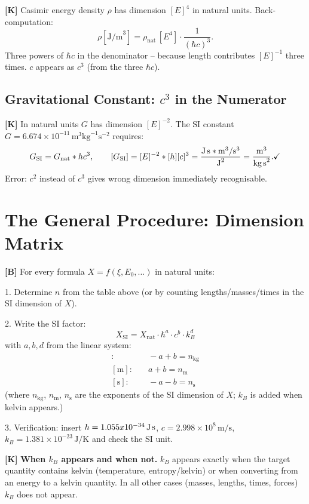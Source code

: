 \textbf{[K]} Casimir energy density $\rho$ has dimension $[E]^4$ in natural
units. Back-computation:
\[
  \rho[\text{J/m}^3]
  = \rho_\text{nat}\,[E^4]\cdot\frac{1}{(\hbar c)^3}.
\]
Three powers of $\hbar c$ in the denominator -- because length contributes
$[E]^{-1}$ three times. $c$ appears as $c^3$ (from the three $\hbar c$).

\subsection{Gravitational Constant: $c^3$ in the Numerator}

\textbf{[K]} In natural units $G$ has dimension $[E]^{-2}$. The SI constant
$G=6{.}674\times10^{-11}\,\text{m}^3\text{kg}^{-1}\text{s}^{-2}$ requires:
\[
  G_\text{SI} = G_\text{nat}\cdot\hbar c^3,
  \qquad
  [G_\text{SI}] = [E]^{-2}\cdot[\hbar][c]^3
  = \frac{\text{J\,s}\cdot\text{m}^3/\text{s}^3}{\text{J}^2}
  = \frac{\text{m}^3}{\text{kg\,s}^2}.\checkmark
\]
Error: $c^2$ instead of $c^3$ gives wrong dimension immediately recognisable.

\section{The General Procedure: Dimension Matrix}

\textbf{[B]} For every formula $X=f(\xi,E_0,\ldots)$ in natural units:

1. Determine $n$ from the table above (or by counting lengths/masses/times in
   the SI dimension of $X$).

2. Write the SI factor:
\[
  X_\text{SI} = X_\text{nat}\cdot\hbar^a\cdot c^b\cdot k_B^d
\]
with $a,b,d$ from the linear system:
\begin{align*}
  [\text{kg}]:&\quad -a+b = n_\text{kg} \\
  [\text{m}]:&\quad a+b = n_\text{m} \\
  [\text{s}]:&\quad -a-b = n_\text{s}
\end{align*}
(where $n_\text{kg}$, $n_\text{m}$, $n_\text{s}$ are the exponents of the SI
dimension of $X$; $k_B$ is added when kelvin appears.)

3. Verification: insert $\hbar=1{.}055\times10^{-34}\,\text{J\,s}$,
   $c=2{.}998\times10^8\,\text{m/s}$,
   $k_B=1{.}381\times10^{-23}\,\text{J/K}$ and check the SI unit.

\textbf{[K]} \textbf{When $k_B$ appears and when not.} $k_B$ appears exactly when
the target quantity contains kelvin (temperature, entropy/kelvin) or when
converting from an energy to a kelvin quantity. In all other cases (masses,
lengths, times, forces) $k_B$ does not appear.

